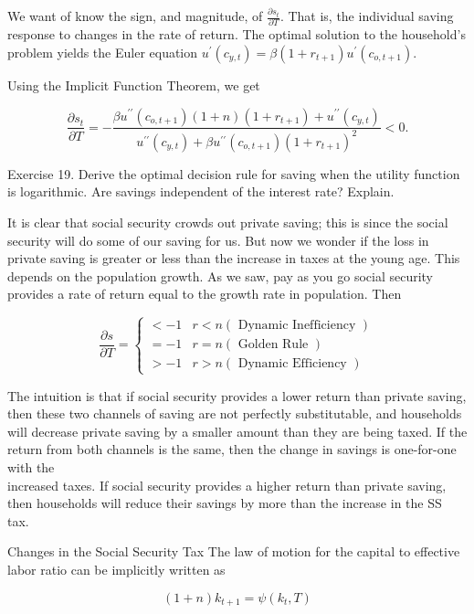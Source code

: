 \documentclass[10pt]{article}
\begin{document}
We want of know the sign, and magnitude, of $\frac{\partial s_{t}}{\partial T}$. That is, the individual saving response to changes in the rate of return. The optimal solution to the household's problem yields the Euler equation $u^{\prime}\left(c_{y, t}\right)=\beta\left(1+r_{t+1}\right) u^{\prime}\left(c_{o, t+1}\right)$.

Using the Implicit Function Theorem, we get

$$
\frac{\partial s_{t}}{\partial T}=-\frac{\beta u^{\prime \prime}\left(c_{o, t+1}\right)(1+n)\left(1+r_{t+1}\right)+u^{\prime \prime}\left(c_{y, t}\right)}{u^{\prime \prime}\left(c_{y, t}\right)+\beta u^{\prime \prime}\left(c_{o, t+1}\right)\left(1+r_{t+1}\right)^{2}}<0 .
$$

Exercise 19. Derive the optimal decision rule for saving when the utility function is logarithmic. Are savings independent of the interest rate? Explain.

It is clear that social security crowds out private saving; this is since the social security will do some of our saving for us. But now we wonder if the loss in private saving is greater or less than the increase in taxes at the young age. This depends on the population growth. As we saw, pay as you go social security provides a rate of return equal to the growth rate in population. Then

$$
\frac{\partial s}{\partial T}= \begin{cases}<-1 & r<n(\text { Dynamic Inefficiency }) \\ =-1 & r=n(\text { Golden Rule }) \\ >-1 & r>n(\text { Dynamic Efficiency })\end{cases}
$$

The intuition is that if social security provides a lower return than private saving, then these two channels of saving are not perfectly substitutable, and households will decrease private saving by a smaller amount than they are being taxed. If the return from both channels is the same, then the change in savings is one-for-one with the\\
increased taxes. If social security provides a higher return than private saving, then households will reduce their savings by more than the increase in the SS tax.

Changes in the Social Security Tax The law of motion for the capital to effective labor ratio can be implicitly written as

$$
(1+n) k_{t+1}=\psi\left(k_{t}, T\right)
$$
\end{document}
